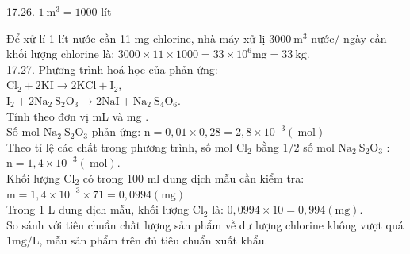 \documentclass[10pt]{article}
\begin{document}
17.26. $1 \mathrm{~m}^{3}=1000$ lít

Để xử lí 1 lít nước cần 11 mg chlorine, nhà máy xử lị $3000 \mathrm{~m}^{3}$ nước/ ngày cần khối lượng chlorine là: $3000 \times 11 \times 1000=33 \times 10^{6} \mathrm{mg}=33 \mathrm{~kg}$.\\
17.27. Phương trình hoá học của phản ứng:\\
$\mathrm{Cl}_{2}+2 \mathrm{KI} \rightarrow 2 \mathrm{KCl}+\mathrm{I}_{2}$,\\
$\mathrm{I}_{2}+2 \mathrm{Na}_{2} \mathrm{~S}_{2} \mathrm{O}_{3} \rightarrow 2 \mathrm{NaI}+\mathrm{Na}_{2} \mathrm{~S}_{4} \mathrm{O}_{6}$.\\
Tính theo đơn vị mL và mg .\\
Số mol $\mathrm{Na}_{2} \mathrm{~S}_{2} \mathrm{O}_{3}$ phản ứng: $\mathrm{n}=0,01 \times 0,28=2,8 \times 10^{-3}(\mathrm{~mol})$\\
Theo tỉ lệ các chất trong phương trình, số mol $\mathrm{Cl}_{2}$ bằng $1 / 2$ số mol $\mathrm{Na}_{2} \mathrm{~S}_{2} \mathrm{O}_{3}$ :\\
$\mathrm{n}=1,4 \times 10^{-3}(\mathrm{~mol})$.\\
Khối lượng $\mathrm{Cl}_{2}$ có trong 100 ml dung dịch mẫu cần kiểm tra:\\
$\mathrm{m}=1,4 \times 10^{-3} \times 71=0,0994(\mathrm{mg})$\\
Trong 1 L dung dịch mẫu, khối lượng $\mathrm{Cl}_{2}$ là: $0,0994 \times 10=0,994(\mathrm{mg})$.\\
So sánh với tiêu chuẩn chất lượng sản phẩm về dư lượng chlorine không vượt quá $1 \mathrm{mg} / \mathrm{L}$, mẫu sản phẩm trên đủ tiêu chuẩn xuất khẩu.
\end{document}
